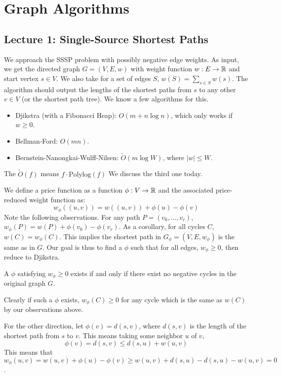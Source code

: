 \section{Graph Algorithms}
\subsection{Lecture 1: Single-Source Shortest Paths}
We approach the SSSP problem with possibly negative edge weights. As input, we get the directed graph $G = (V, E, w)$ with weight function $w: E \to \operatorname{\mathbb{R}}$
and start vertex $s \in V$. We also take for a set of edges $S$, $w(S) = \sum_{s \in S} w(s)$. The algorithm should output the lengths of the shortest paths from $s$ to any other $v \in V$ (or the shortest path tree).
We know a few algorithms for this.

\begin{itemize}
    \item Djikstra (with a Fibonacci Heap): $O(m + n \log n)$, which only works if $w \geq 0$.
    \item Bellman-Ford: $O(mn)$.
    \item Bernstein-Nanongkai-Wulff-Nilsen: $\tilde{O}(m \log W)$, where $|w| \leq W$.
\end{itemize}
The $\tilde{O}(f)$ means $f \cdot \text{Polylog}(f)$ We discuss the third one today.

We define a price function as a function $\phi : V \to \operatorname{\mathbb{R}}$ and the associated price-reduced weight function as:
\[ w_{\phi}((u, v)) = w((u, v)) + \phi(u) - \phi(v) \]
Note the following observations. For any path $P = (v_0, \dots, v_r)$, $w_{\phi}(P) = w(P) + \phi(v_0) - \phi(v_r)$.
As a corollary, for all cycles $C$, $w(C) = w_{\phi}(C)$. This implies the shortest path in $G_{\phi} = (V, E, w_{\phi})$ is the same as in $G$.
Our goal is thus to find a $\phi$ such that for all edges, $w_{\phi} \geq 0$, then reduce to Djikstra.

\begin{theorem}
    A $\phi$ satisfying $w_{\phi} \geq 0$ exists if and only if there exist no negative cycles in the original graph $G$.

    \begin{proof*}
        Clearly if such a $\phi$ exists, $w_{\phi}(C) \geq 0$ for any cycle which is the same as $w(C)$ by our observations above.

        For the other direction, let $\phi(v) = d(s, v)$, where $d(s, v)$ is the length of the shortest path from $s$ to $v$.
        This means taking some neighbor $u$ of $v$, 
        \[ \phi(v) = d(s, v) \leq d(s, u) + w(u, v) \]
        This means that $w_{\phi}(u, v) = w(u, v) + \phi(u) - \phi(v) \geq w(u, v) + d(s, u) - d(s, u) - w(u, v) = 0$.
    \end{proof*}
\end{theorem}

